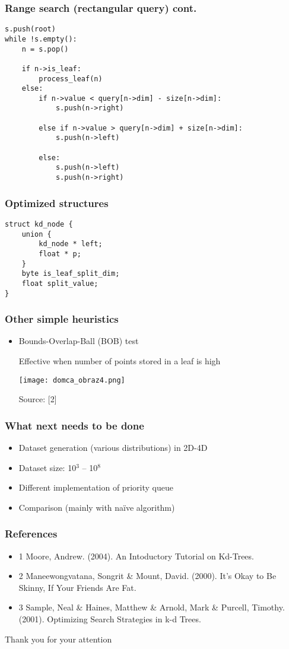 \documentclass{beamer}
\begin{document}
\begin{frame}[fragile]
 \frametitle{Range search (rectangular query) cont.}
  \begin{lstlisting}[style=CStyle]
s.push(root)
while !s.empty():
	n = s.pop()

	if n->is_leaf:
		process_leaf(n)
	else:
		if n->value < query[n->dim] - size[n->dim]:
			s.push(n->right)

		else if n->value > query[n->dim] + size[n->dim]:
			s.push(n->left)

		else:
			s.push(n->left)
			s.push(n->right)
 \end{lstlisting}
\end{frame}

\begin{frame}[fragile]
 \frametitle{Optimized structures}
    \begin{lstlisting}[style=CStyle]
struct kd_node {
    union {
        kd_node * left;
        float * p;
    }
    byte is_leaf_split_dim;
    float split_value;
}
    \end{lstlisting}
\end{frame}

\begin{frame}
 \frametitle{Other simple heuristics}
 \begin{itemize}
  \item Bounds-Overlap-Ball (BOB) test
  
  Effective when number of points stored in a leaf is high
  
  \centering
  \texttt{[image: domca\_obraz4.png]}
  
  Source: [2]
 \end{itemize}

\end{frame}

\begin{frame}
 \frametitle{What next needs to be done}
 \begin{itemize}
  \item Dataset generation (various distributions) in 2D-4D
  \item Dataset size: 10$^3$ – 10$^8$
  \item Different implementation of priority queue
  \item Comparison (mainly with naïve algorithm)
 \end{itemize}

\end{frame}

\begin{frame}[fragile]
 \frametitle{References}
 \begin{itemize}
  \item 1 Moore, Andrew. (2004). An Intoductory Tutorial on Kd-Trees.
  \item 2 Maneewongvatana, Songrit \& Mount, David. (2000). It's Okay to Be Skinny, If Your Friends Are Fat.
  \item 3 Sample, Neal \& Haines, Matthew \& Arnold, Mark \& Purcell, Timothy. (2001). Optimizing Search Strategies in k-d Trees.
 \end{itemize}

\end{frame}

\begin{frame}
\begin{center}
        Thank you for your attention
\end{center}
\end{frame}
\end{document}
